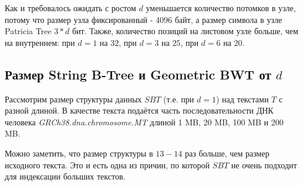 \documentclass[a4paper,12pt]{article}
\begin{document}
\begin{center}
\pgfplotsset{width=12.5cm,compat=newest}
\end{center}

Как и требовалось ожидать с ростом $d$ уменьшается количество потомков в узле, потому что размер узла фиксированный - 4096 байт, а размер символа в узле Patricia Tree $3 * d$ бит. Также, количество позиций на листовом узле больше, чем на внутреннем: при $d = 1$ на $32$, при $d = 3$ на $25$, при $d = 6$ на $20$.

\subsection{Размер String B-Tree и Geometric BWT от $d$}

Рассмотрим размер структуры данных $SBT$ (т.е. при $d=1$) над текстами $T$ с разной длиной. В качестве текста подаётся часть последовательности ДНК человека \textit{GRCh38.dna.chromosome.MT} длиной 1 MB, 20 MB, 100 MB и 200 MB.


\begin{center}
\pgfplotsset{width=12.5cm,compat=newest}
\end{center}

Можно заметить, что размер структуры в $13-14$ раз больше, чем размер исходного текста. Это и есть одна из причин, по которой $SBT$ не очень подходит для индексации больших текстов.
\end{document}
